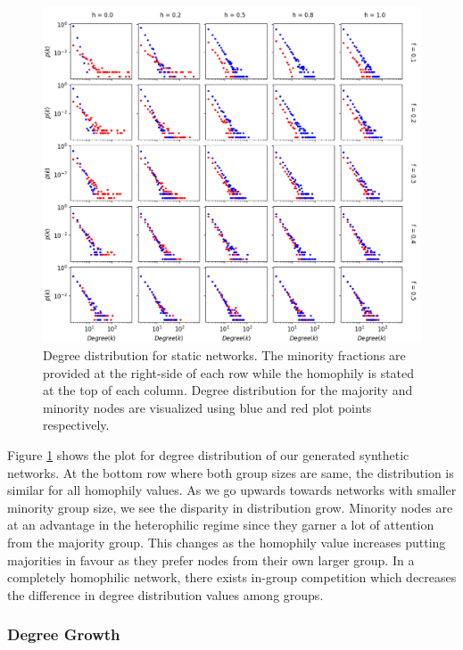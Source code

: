 \begin{figure}[h!]
	\centering
	\includegraphics[width=1.0\textwidth]{images/dd_static.png}
	\caption{Degree distribution for static networks. The minority fractions are provided at the right-side of each row while the homophily is stated at the top of each column. Degree distribution for the majority and minority nodes are visualized using blue and red plot points respectively.}
	\label{dd_static_fig}
\end{figure}

Figure \ref{dd_static_fig} shows the plot for degree distribution of our generated synthetic networks. At the bottom row where both group sizes are same, the distribution is similar for all homophily values. As we go upwards towards networks with smaller minority group size, we see the disparity in distribution grow. Minority nodes are at an advantage in the heterophilic regime since they garner a lot of attention from the majority group. This changes as the homophily value increases putting majorities in favour as they prefer nodes from their own larger group. In a completely homophilic network, there exists in-group competition which decreases the difference in degree distribution values among groups.

\subsubsection{Degree Growth}

